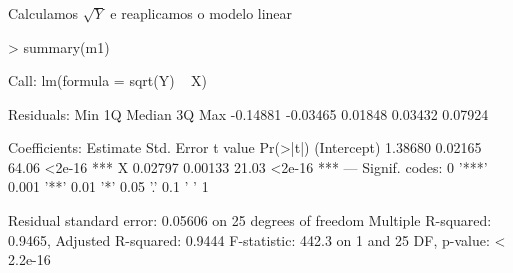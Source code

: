 \documentclass[14pt,aspectratio=1610]{beamer}
\begin{document}
\begin{frame}[fragile]{}
\frametitle{ }
\begin{block}{Calculamos $\sqrt{Y}$ e reaplicamos o modelo linear}

\begin{Schunk}
\begin{Sinput}
> summary(m1)
\end{Sinput}
\begin{Soutput}
Call:
lm(formula = sqrt(Y) ~ X)

Residuals:
     Min       1Q   Median       3Q      Max 
-0.14881 -0.03465  0.01848  0.03432  0.07924 

Coefficients:
            Estimate Std. Error t value Pr(>|t|)    
(Intercept)  1.38680    0.02165   64.06   <2e-16 ***
X            0.02797    0.00133   21.03   <2e-16 ***
---
Signif. codes:  0 '***' 0.001 '**' 0.01 '*' 0.05 '.' 0.1 ' ' 1

Residual standard error: 0.05606 on 25 degrees of freedom
Multiple R-squared:  0.9465,	Adjusted R-squared:  0.9444 
F-statistic: 442.3 on 1 and 25 DF,  p-value: < 2.2e-16
\end{Soutput}
\end{Schunk}

\end{block}
\end{frame}
\end{document}
